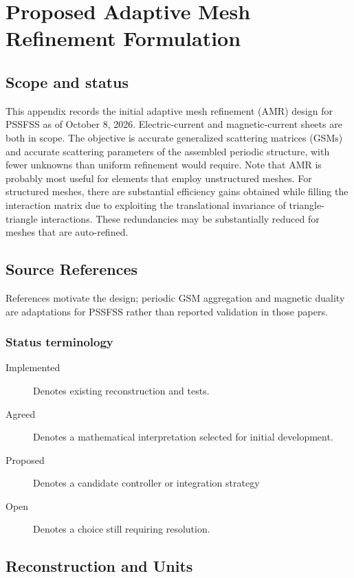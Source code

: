 
\chapter{Proposed Adaptive Mesh Refinement Formulation}
\label{app:amr}

\section{Scope and status}
This appendix records the initial adaptive mesh refinement (AMR) design for
PSSFSS as of October 8, 2026. Electric-current and magnetic-current sheets are
both in scope. The objective is accurate generalized scattering matrices (GSMs)
and accurate scattering parameters of the assembled periodic structure, with
fewer unknowns than uniform refinement would require.  Note that AMR is probably
most useful for elements that employ unstructured meshes.  For structured meshes,
there are substantial efficiency gains obtained while filling the interaction
matrix due to exploiting the translational invariance of triangle-triangle
interactions.  These redundancies may be substantially reduced for meshes that
are auto-refined.  




\section{Source References}
References \cite{kim2017error,kim2018adaptive,kim2018evaluation,kim2022adaptive,pete:22}
motivate the design; periodic GSM aggregation and magnetic
duality are adaptations for PSSFSS rather than reported validation in those papers.



\subsection{Status terminology}
\begin{description}
\item[Implemented] Denotes existing reconstruction and tests.
\item[Agreed] Denotes a mathematical interpretation selected for initial development.
\item[Proposed] Denotes a candidate controller or integration strategy
\item[Open] Denotes a choice still requiring resolution.
\end{description}


\section{Reconstruction and Units}

